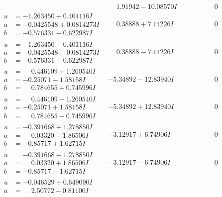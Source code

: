 \documentclass[1p]{elsarticle_modified}
\theoremstyle{definition}
\begin{document}
$$\begin{array}{c|c|c}
 & \phantom{-}1.91942 - 10.08570 I & \phantom{-0.000000 } 0 \\ \hline\begin{aligned}
u &= -1.263450 + 0.401116 I \\
a &= -0.0425548 + 0.0814273 I \\
b &= -0.576331 + 0.622987 I\end{aligned}
 & \phantom{-}0.38888 + 7.14226 I & \phantom{-0.000000 } 0 \\ \hline\begin{aligned}
u &= -1.263450 - 0.401116 I \\
a &= -0.0425548 - 0.0814273 I \\
b &= -0.576331 - 0.622987 I\end{aligned}
 & \phantom{-}0.38888 - 7.14226 I & \phantom{-0.000000 } 0 \\ \hline\begin{aligned}
u &= \phantom{-}0.446109 + 1.260540 I \\
a &= -0.25071 - 1.58158 I \\
b &= \phantom{-}0.784655 + 0.745996 I\end{aligned}
 & -5.34892 - 12.83940 I & \phantom{-0.000000 } 0 \\ \hline\begin{aligned}
u &= \phantom{-}0.446109 - 1.260540 I \\
a &= -0.25071 + 1.58158 I \\
b &= \phantom{-}0.784655 - 0.745996 I\end{aligned}
 & -5.34892 + 12.83940 I & \phantom{-0.000000 } 0 \\ \hline\begin{aligned}
u &= -0.391668 + 1.278850 I \\
a &= \phantom{-}0.03320 - 1.86506 I \\
b &= -0.85717 + 1.62715 I\end{aligned}
 & -3.12917 + 6.74906 I & \phantom{-0.000000 } 0 \\ \hline\begin{aligned}
u &= -0.391668 - 1.278850 I \\
a &= \phantom{-}0.03320 + 1.86506 I \\
b &= -0.85717 - 1.62715 I\end{aligned}
 & -3.12917 - 6.74906 I & \phantom{-0.000000 } 0 \\ \hline\begin{aligned}
u &= -0.046529 + 0.649090 I \\
a &= \phantom{-}2.50772 - 0.81100 I \\

\end{aligned}
\end{array}$$
\end{document}
